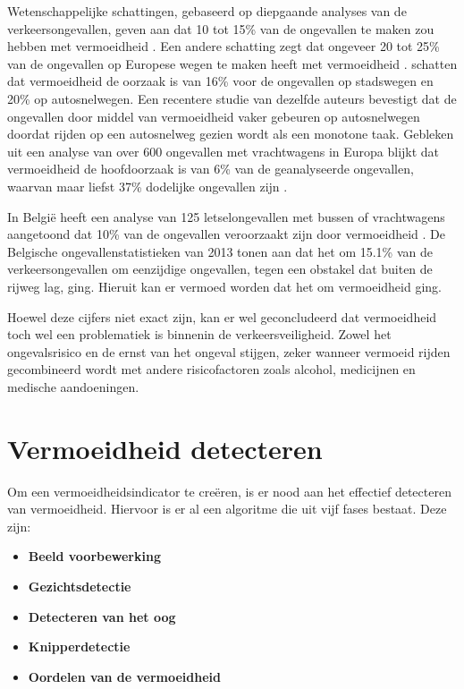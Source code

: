 Wetenschappelijke schattingen, gebaseerd op diepgaande analyses van de verkeersongevallen, geven aan dat 10 tot 15\% van de ongevallen te maken zou hebben met vermoeidheid \autocite{VanSchagen2003}. Een andere schatting zegt dat ongeveer 20 tot 25\% van de ongevallen op Europese wegen te maken heeft met vermoeidheid \autocite{Akerstedt2013}. \textcite{Horne1995} schatten dat vermoeidheid de oorzaak is van 16\% voor de ongevallen op stadswegen en 20\% op autosnelwegen. Een recentere studie van dezelfde auteurs \autocite{Horne1999} bevestigt dat de ongevallen door middel van vermoeidheid vaker gebeuren op autosnelwegen doordat rijden op een autosnelweg gezien wordt als een monotone taak. 
Gebleken uit een analyse van over 600 ongevallen met vrachtwagens in Europa blijkt dat vermoeidheid de hoofdoorzaak is van 6\% van de geanalyseerde ongevallen, waarvan maar liefst 37\% dodelijke ongevallen zijn \autocite{IRU2007}.

In België heeft een analyse van 125 letselongevallen met bussen of vrachtwagens aangetoond dat 10\% van de ongevallen veroorzaakt zijn door vermoeidheid \autocite{Herdewyn2010}. De Belgische ongevallenstatistieken van 2013 tonen aan dat het om 15.1\% van de verkeersongevallen om eenzijdige ongevallen, tegen een obstakel dat buiten de rijweg lag, ging. Hieruit kan er vermoed worden dat het om vermoeidheid ging.

Hoewel deze cijfers niet exact zijn, kan er wel geconcludeerd dat vermoeidheid toch wel een problematiek is binnenin de verkeersveiligheid. Zowel het ongevalsrisico en de ernst van het ongeval stijgen, zeker wanneer vermoeid rijden gecombineerd wordt met andere risicofactoren zoals alcohol, medicijnen en medische aandoeningen.

\section{Vermoeidheid detecteren}
Om een vermoeidheidsindicator te creëren, is er nood aan het effectief detecteren van vermoeidheid. Hiervoor is er al een algoritme die uit vijf fases bestaat. Deze zijn:
\begin{itemize}
    \item \textbf{Beeld voorbewerking}
    \item \textbf{Gezichtsdetectie}
    \item \textbf{Detecteren van het oog}
    \item \textbf{Knipperdetectie}
    \item \textbf{Oordelen van de vermoeidheid}
\end{itemize}
\autocite{Jibo2013}

